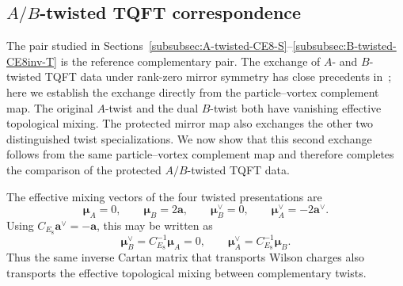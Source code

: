 \documentclass[11pt,a4paper]{article}
\numberwithin{equation}{section}
\begin{document}
\subsection{$A/B$-twisted TQFT correspondence}
\label{subsec:AB-TQFT-correspondence}

The pair studied in Sections~\ref{subsubsec:A-twisted-CE8-S}--\ref{subsubsec:B-twisted-CE8inv-T} is the reference complementary pair.  The exchange of $A$- and $B$-twisted TQFT data under rank-zero mirror symmetry has close precedents in~\cite{Gang:2021hrd,CreutzigGarnerKim:2024mirror}; here we establish the exchange directly from the particle--vortex complement map.  The original $A$-twist and the dual $B$-twist both have vanishing effective topological mixing.  The protected mirror map also exchanges the other two distinguished twist specializations.  We now show that this second exchange follows from the same particle--vortex complement map and therefore completes the comparison of the protected $A/B$-twisted TQFT data.



The effective mixing vectors of the four twisted presentations are
\begin{equation}
  \boldsymbol\mu_A=0,
  \qquad
  \boldsymbol\mu_B=2\boldsymbol a,
  \qquad
  \boldsymbol\mu_B^\vee=0,
  \qquad
  \boldsymbol\mu_A^\vee=-2\boldsymbol a^\vee.
  \label{eq:four-AB-effective-mixings}
\end{equation}
Using $C_{E_8}\boldsymbol a^\vee=-\boldsymbol a$, this may be written as
\begin{equation}
  \boldsymbol\mu_B^\vee=C_{E_8}^{-1}\boldsymbol\mu_A=0,
  \qquad
  \boldsymbol\mu_A^\vee=C_{E_8}^{-1}\boldsymbol\mu_B.
  \label{eq:AB-mixing-complement-map}
\end{equation}
Thus the same inverse Cartan matrix that transports Wilson charges also transports the effective topological mixing between complementary twists.
\end{document}
